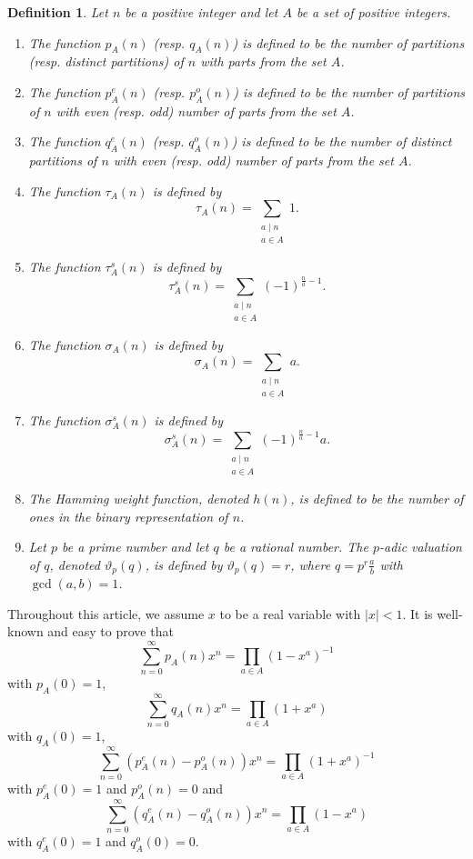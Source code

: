 \documentclass[11pt]{article}
\newtheorem{definition}{Definition}
\begin{document}
\begin{definition}
\normalfont 
Let $n$ be a positive integer and let $A$ be a set of positive integers. 
\begin{enumerate}
\item The function $p_A(n)$ (resp. $q_A(n)$) is defined to be the number of partitions (resp. distinct partitions) of $n$ with parts from the set $A$.
\item The function $p_A^e(n)$ (resp. $p_A^o(n)$) is defined to be the number of partitions of $n$ with even (resp. odd) number of parts from the set $A$.
\item  The function $q_A^e(n)$ (resp. $q_A^o(n)$) is defined to be the number of distinct partitions of $n$ with even (resp. odd) number of parts from the set $A$.
\item The function $\tau_A(n)$ is defined by 
\[\tau_A(n)=\sum_{\substack{a\mid n\\ a\in A}}1.
\]
\item The function $\tau_A^s(n)$ is defined by 
\[\tau_A^s(n)=\sum_{\substack{a\mid n\\ a\in A}}(-1)^{\frac{n}{a}-1}.
\]
\item The function $\sigma_A(n)$ is defined by 
\[\sigma_A(n)=\sum_{\substack{a\mid n\\ a\in A}}a.
\]
\item The function $\sigma_A^s(n)$ is defined by 
\[\sigma_A^s(n)=\sum_{\substack{a\mid n\\ a\in A}}(-1)^{\frac{n}{a}-1}a.
\]
\item The Hamming weight function, denoted $h(n)$, is defined to be the number of ones in the binary representation of $n$. 
\item Let $p$ be a prime number and let $q$ be a rational number. The $p$-adic valuation of $q$, denoted $\vartheta_p(q)$, is defined by $\vartheta_p(q)=r$, where $q=p^r\frac{a}{b}$ with $\gcd(a,b)=1$.
\end{enumerate}
\end{definition}
Throughout this article, we assume $x$ to be a real variable with $|x|<1$. 
It is well-known and easy to prove that
\begin{equation}\label{gf1}
\sum_{n=0}^{\infty}p_A(n)x^n=\prod_{a\in A}(1-x^a)^{-1}
\end{equation}
with $p_A(0)=1$,
\begin{equation}\label{gf2}
\sum_{n=0}^{\infty}q_A(n)x^n=\prod_{a\in A}(1+x^a)
\end{equation}
with $q_A(0)=1$,
\begin{equation}\label{gf3}
\sum_{n=0}^{\infty}\left(p_A^e(n)-p_A^o(n)\right)x^n=\prod_{a\in A}(1+x^a)^{-1}
\end{equation}
with $p_A^e(0)=1$ and $p_A^o(n)=0$
\newline 
and
\begin{equation}\label{gf4}
\sum_{n=0}^{\infty}\left(q_A^e(n)-q_A^o(n)\right)x^n=\prod_{a\in A}(1-x^a)
\end{equation}
with $q_A^e(0)=1$ and $q_A^o(0)=0$.
\end{document}
